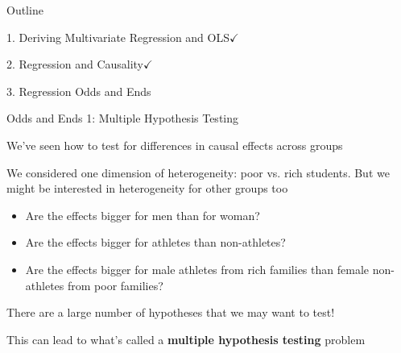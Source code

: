 \documentclass[11pt,english,handout]{beamer}
\newenvironment{wideitemize}{\itemize\addtolength{\itemsep}{10pt}}{\enditemize}
\begin{document}
	\begin{frame}{Outline}

	\textcolor{red!75!green!50!blue!25!gray}{1. Deriving Multivariate Regression and OLS}$\checkmark$
	\vspace{0.8cm}
	
	\textcolor{red!75!green!50!blue!25!gray}{2. Regression and Causality}$\checkmark$
	\vspace{0.8cm}
	
	3. Regression Odds and Ends
	
	\end{frame}

\begin{frame}{Odds and Ends 1: Multiple Hypothesis Testing}
	\begin{wideitemize}
		\item
		We've seen how to test for differences in causal effects across groups
		
		\pause
		\item
		We considered one dimension of heterogeneity: poor vs. rich students. But we might be interested in heterogeneity for other groups too\smallskip
			\begin{itemize}
				\item
				Are the effects bigger for men than for woman? \smallskip
				
				\pause
				\item
				Are the effects bigger for athletes than non-athletes? \smallskip
				
				\pause
				\item
				Are the effects bigger for male athletes from rich families than female non-athletes from poor families? 	
		   \end{itemize}
	   
	  \pause
	  \item
	  There are a large number of hypotheses that we may want to test! 	
	  
	  \pause
	  \item
	  This can lead to what's called a \textbf{multiple hypothesis testing} problem
	\end{wideitemize}	
\end{frame}
\end{document}
